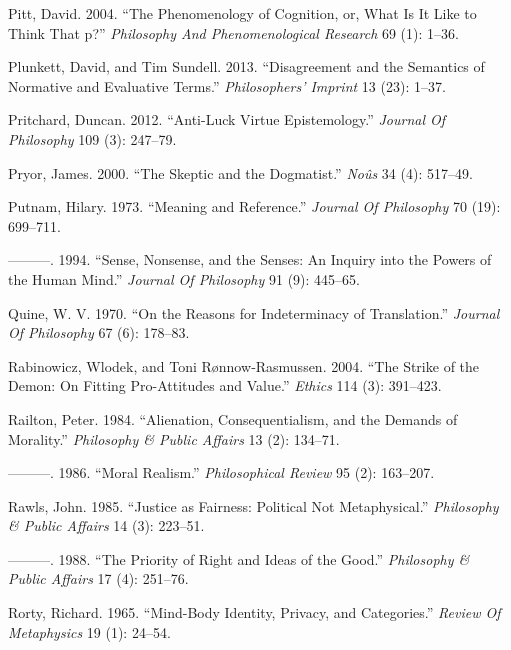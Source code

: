 \documentclass[
  10pt,
  letterpaper,
  DIV=11,
  numbers=noendperiod,
  twoside]{scrartcl}
\newlength{\cslhangindent}
\newenvironment{CSLReferences}[2] %
 {\begin{list}{}{%
  \setlength{\itemindent}{0pt}
  \setlength{\leftmargin}{0pt}
  \setlength{\parsep}{0pt}
  \ifodd #1
   \setlength{\leftmargin}{\cslhangindent}
   \setlength{\itemindent}{-1\cslhangindent}
  \fi
  \setlength{\itemsep}{#2\baselineskip}}}
 {\end{list}}
\begin{document}
\begin{CSLReferences}{1}{0}
Pitt, David. 2004. {``The Phenomenology of Cognition, or, What Is It
Like to Think That p?''} \emph{Philosophy And Phenomenological Research}
69 (1): 1--36.

Plunkett, David, and Tim Sundell. 2013. {``Disagreement and the
Semantics of Normative and Evaluative Terms.''} \emph{Philosophers'
Imprint} 13 (23): 1--37.

Pritchard, Duncan. 2012. {``Anti-Luck Virtue Epistemology.''}
\emph{Journal Of Philosophy} 109 (3): 247--79.

Pryor, James. 2000. {``The Skeptic and the Dogmatist.''} \emph{Noûs} 34
(4): 517--49.

Putnam, Hilary. 1973. {``Meaning and Reference.''} \emph{Journal Of
Philosophy} 70 (19): 699--711.

---------. 1994. {``Sense, Nonsense, and the Senses: An Inquiry into the
Powers of the Human Mind.''} \emph{Journal Of Philosophy} 91 (9):
445--65.

Quine, W. V. 1970. {``On the Reasons for Indeterminacy of
Translation.''} \emph{Journal Of Philosophy} 67 (6): 178--83.

Rabinowicz, Wlodek, and Toni Rønnow‐Rasmussen. 2004. {``The Strike of
the Demon: On Fitting Pro-Attitudes and Value.''} \emph{Ethics} 114 (3):
391--423.

Railton, Peter. 1984. {``Alienation, Consequentialism, and the Demands
of Morality.''} \emph{Philosophy \& Public Affairs} 13 (2): 134--71.

---------. 1986. {``Moral Realism.''} \emph{Philosophical Review} 95
(2): 163--207.

Rawls, John. 1985. {``Justice as Fairness: Political Not
Metaphysical.''} \emph{Philosophy \& Public Affairs} 14 (3): 223--51.

---------. 1988. {``The Priority of Right and Ideas of the Good.''}
\emph{Philosophy \& Public Affairs} 17 (4): 251--76.

Rorty, Richard. 1965. {``Mind-Body Identity, Privacy, and Categories.''}
\emph{Review Of Metaphysics} 19 (1): 24--54.


\end{CSLReferences}
\end{document}
